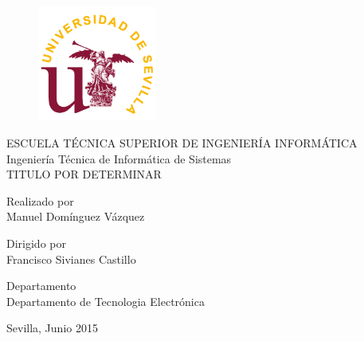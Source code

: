 \begin{titlepage}
\begin{center}
	\begin{figure}[h]
		\centering
			\includegraphics[width=0.35\textwidth]{imagenes/logous.png}
	\end{figure}
	
	\begin{Large}
	\vspace*{1cm}
	ESCUELA TÉCNICA  SUPERIOR DE  INGENIERÍA  INFORMÁTICA\\
	\vspace*{1cm}
	Ingeniería Técnica de Informática de Sistemas\\
    \vspace*{2cm}
    TITULO POR DETERMINAR\\
	\end{Large}
	\vspace*{2cm}
	Realizado por\\
	Manuel Domínguez Vázquez
	\vspace*{0.5cm}
	
	Dirigido por\\
	Francisco Sivianes Castillo
	\vspace*{0.5cm}
	
	Departamento\\
	Departamento de Tecnologia Electrónica\\
\end{center}
	\vspace*{1.5cm}
	\hfill Sevilla, Junio 2015
\end{titlepage}
\cleardoublepage

